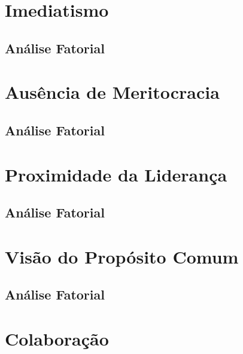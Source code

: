 \documentclass[]{book}
\begin{document}
\hypertarget{imediatismo}{%
\section{Imediatismo}\label{imediatismo}}

\hypertarget{analise-fatorial-4}{%
\subsection{Análise Fatorial}\label{analise-fatorial-4}}

\hypertarget{ausencia-de-meritocracia}{%
\section{Ausência de Meritocracia}\label{ausencia-de-meritocracia}}

\hypertarget{analise-fatorial-5}{%
\subsection{Análise Fatorial}\label{analise-fatorial-5}}

\hypertarget{proximidade-da-lideranca}{%
\section{Proximidade da Liderança}\label{proximidade-da-lideranca}}

\hypertarget{analise-fatorial-6}{%
\subsection{Análise Fatorial}\label{analise-fatorial-6}}

\hypertarget{visao-do-proposito-comum}{%
\section{Visão do Propósito Comum}\label{visao-do-proposito-comum}}

\hypertarget{analise-fatorial-7}{%
\subsection{Análise Fatorial}\label{analise-fatorial-7}}

\hypertarget{colaboracao}{%
\section{Colaboração}\label{colaboracao}}
\end{document}

